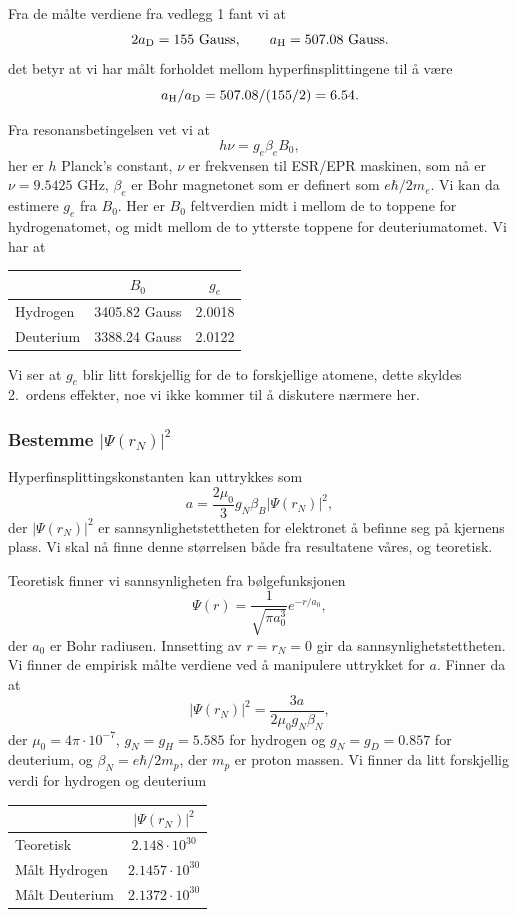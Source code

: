 \documentclass[a4paper, 11pt, notitlepage]{article}
\begin{document}
Fra de målte verdiene fra vedlegg 1 fant vi at
$$2a_{\rm D} = 155 \mbox{ Gauss}, \qquad a_{\rm H} = 507.08 \mbox{ Gauss}.$$
det betyr at vi har målt forholdet mellom hyperfinsplittingene til å være
$$a_{\rm H} / a_{\rm D} = 507.08/(155/2) = 6.54.$$

Fra resonansbetingelsen vet vi at
$$h\nu = g_e\beta_e B_0,$$
her er $h$ Planck's constant, $\nu$ er frekvensen til ESR/EPR maskinen, som nå er $\nu = 9.5425$ GHz, $\beta_e$ er Bohr magnetonet som er definert som $e\hbar/2m_e$. Vi kan da estimere $g_e$ fra $B_0$. Her er $B_0$ feltverdien midt i mellom de to toppene for hydrogenatomet, og midt mellom de to ytterste toppene for deuteriumatomet. Vi har at
\begin{center}
\begin{tabular}{l|c|c}
 & $B_0$ & $g_e$ \\
\hline
Hydrogen & 3405.82 Gauss & 2.0018 \\
\hline
Deuterium & 3388.24 Gauss & 2.0122 \\
\end{tabular}
\end{center}
Vi ser at $g_e$ blir litt forskjellig for de to forskjellige atomene, dette skyldes 2.\ ordens effekter, noe vi ikke kommer til å diskutere nærmere her.

\subsubsection{Bestemme $|\Psi(r_N)|^2$}

Hyperfinsplittingskonstanten kan uttrykkes som
$$a = \frac{2\mu_0}{3}g_N\beta_B |\Psi(r_N)|^2,$$
der $|\Psi(r_N)|^2$ er sannsynlighetstettheten for elektronet å befinne seg på kjernens plass. Vi skal nå finne denne størrelsen både fra resultatene våres, og teoretisk.

Teoretisk finner vi sannsynligheten fra bølgefunksjonen
$$\Psi(r) = \frac{1}{\sqrt{\pi a_0^3}}e^{-r/a_0},$$
der $a_0$ er Bohr radiusen. Innsetting av $r=r_N = 0$ gir da sannsynlighetstettheten. Vi finner de empirisk målte verdiene ved å manipulere uttrykket for $a$. Finner da at
$$|\Psi(r_N)|^2 = \frac{3a}{2\mu_0 g_N \beta_N},$$
der $\mu_0 = 4\pi\cdot10^{-7}$, $g_N = g_H = 5.585$ for hydrogen og $g_N = g_D = 0.857$ for deuterium, og $\beta_N = e\hbar/2m_p$, der $m_p$ er proton massen. Vi finner da litt forskjellig verdi for hydrogen og deuterium
\begin{center}
 \begin{tabular}{l|c}
             & $|\Psi(r_N)|^2$ \\ \hline
 Teoretisk & $2.148 \cdot 10^{30}$ \\ \hline 
 Målt Hydrogen & $2.1457 \cdot 10^{30}$   \\ \hline
 Målt Deuterium & $2.1372 \cdot 10^{30}$
 \end{tabular}
\end{center}
\end{document}
